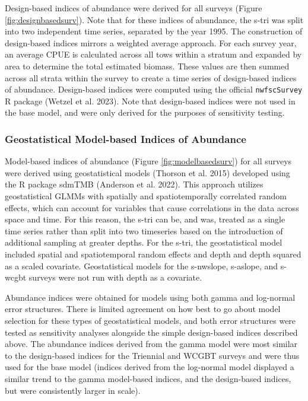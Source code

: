 \documentclass[11pt,
  letterpaper,
]{article}
\begin{document}
Design-based indices of abundance were derived for all surveys (Figure \ref{fig:designbasedsurv}). Note that for these indices of abundance, the \gls{s-tri} was split into two independent time series, separated by the year 1995. The construction of design-based indices mirrors a weighted average approach. For each survey year, an average CPUE is calculated across all tows within a stratum and expanded by area to determine the total estimated biomass. These values are then summed across all strata within the survey to create a time series of design-based indices of abundance. Design-based indices were computed using the official \texttt{nwfscSurvey} R package (Wetzel et al. 2023). Note that design-based indices were not used in the base model, and were only derived for the purposes of sensitivity testing.

\hypertarget{geostatistical-model-based-indices-of-abundance}{%
\subsubsection{Geostatistical Model-based Indices of Abundance}\label{geostatistical-model-based-indices-of-abundance}}

Model-based indices of abundance (Figure \ref{fig:modelbasedsurv}) for all surveys were derived using geostatistical models (Thorson et al. 2015) developed using the R package sdmTMB (Anderson et al. 2022). This approach utilizes geostatistical GLMMs with spatially and spatiotemporally correlated random effects, which can account for variables that cause correlations in the data across space and time. For this reason, the \gls{s-tri} can be, and was, treated as a single time series rather than split into two timeseries based on the introduction of additional sampling at greater depths. For the \gls{s-tri}, the geostatistical model included spatial and spatiotemporal random effects and depth and depth squared as a scaled covariate. Geostatistical models for the \gls{s-nwslope}, \gls{s-aslope}, and \gls{s-wcgbt} surveys were not run with depth as a covariate.

Abundance indices were obtained for models using both gamma and log-normal error structures. There is limited agreement on how best to go about model selection for these types of geostatistical models, and both error structures were tested as sensitivity analyses alongside the simple design-based indices described above. The abundance indices derived from the gamma model were most similar to the design-based indices for the Triennial and WCGBT surveys and were thus used for the base model (indices derived from the log-normal model displayed a similar trend to the gamma model-based indices, and the design-based indices, but were consistently larger in scale).
\end{document}
